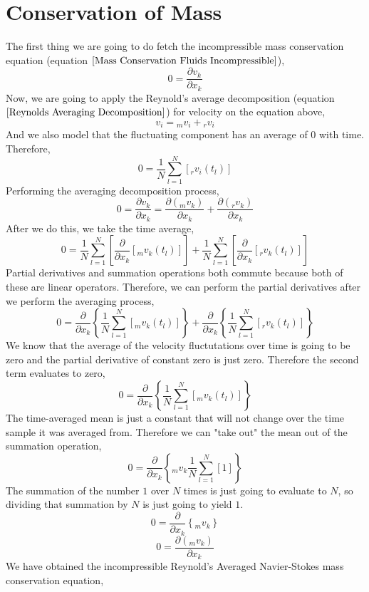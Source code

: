 \section{Conservation of Mass}
\begin{comment}
\end{comment}
The first thing we are going to do fetch the incompressible mass conservation equation (equation $\ref{Mass Conservation Fluids Incompressible}$),
$$0 = \frac{\partial v_{k}}{\partial x_{k}}$$
Now, we are going to apply the Reynold's average decomposition (equation $\ref{Reynolds Averaging Decomposition}$) for velocity on the equation above,
$$v_{i} = {}_{m}v_{i} + {}_{r}v_{i}$$
And we also model that the fluctuating component has an average of $0$ with time. Therefore,
$$0 = \frac{1}{N}\sum^{N}_{l = 1}\left[{}_{r}v_{i}(t_{l})\right]$$
Performing the averaging decomposition process,
$$0 = \frac{\partial v_{k}}{\partial x_{k}} = \frac{\partial ({}_{m}v_{k})}{\partial x_{k}} + \frac{\partial ({}_{r}v_{k})}{\partial x_{k}}$$
After we do this, we take the time average,
$$0 = \frac{1}{N}\sum^{N}_{l = 1}\left[\frac{\partial }{\partial x_{k}}[{}_{m}v_{k}(t_{l})]\right] + \frac{1}{N}\sum^{N}_{l = 1}\left[\frac{\partial }{\partial x_{k}}[{}_{r}v_{k}(t_{l})]\right]$$
Partial derivatives and summation operations both commute because both of these are linear operators. 
Therefore, we can perform the partial derivatives after we perform the averaging process,
$$0 = \frac{\partial }{\partial x_{k}}\left\{\frac{1}{N}\sum^{N}_{l = 1}\left[{}_{m}v_{k}(t_{l})\right]\right\} + \frac{\partial }{\partial x_{k}}\left\{\frac{1}{N}\sum^{N}_{l = 1}\left[{}_{r}v_{k}(t_{l})\right]\right\}$$
We know that the average of the velocity fluctutations over time is going to be zero and the partial derivative of constant zero is just zero. 
Therefore the second term evaluates to zero,
$$0 = \frac{\partial }{\partial x_{k}}\left\{\frac{1}{N}\sum^{N}_{l = 1}\left[{}_{m}v_{k}(t_{l})\right]\right\}$$
The time-averaged mean is just a constant that will not change over the time sample it was averaged from. 
Therefore we can "take out" the mean out of the summation operation,
$$0 = \frac{\partial }{\partial x_{k}}\left\{{}_{m}v_{k}\frac{1}{N}\sum^{N}_{l = 1}\left[1\right]\right\}$$
The summation of the number $1$ over $N$ times is just going to evaluate to $N$, so dividing that summation by $N$ is just going to yield $1$.
$$0 = \frac{\partial }{\partial x_{k}}\left\{{}_{m}v_{k}\right\}$$
$$0 = \frac{\partial ({}_{m}v_{k})}{\partial x_{k}}$$
We have obtained the incompressible Reynold's Averaged Navier-Stokes mass conservation equation,


